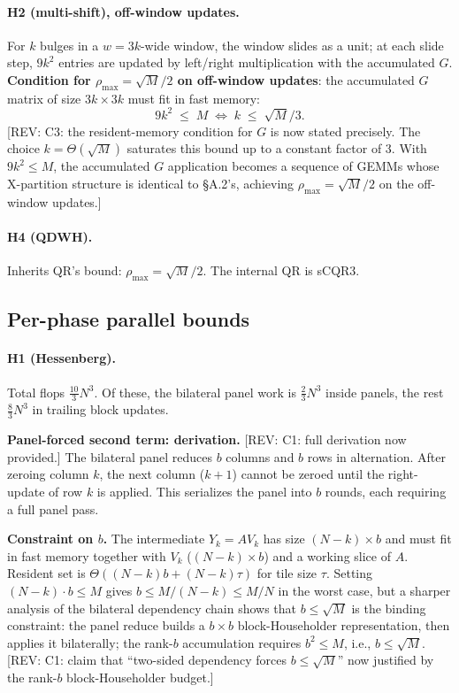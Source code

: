 \documentclass[11pt]{article}
\newcommand{\REV}[1]{\textcolor{blue!60!black}{\small\textsf{[REV: #1]}}}
\begin{document}
\paragraph{H2 (multi-shift), off-window updates.}
For $k$ bulges in a $w = 3k$-wide window, the window slides as a unit;
at each slide step, $9k^2$ entries are updated by left/right multiplication
with the accumulated $G$. \textbf{Condition for $\rho_{\max} = \sqrt{M}/2$
on off-window updates}: the accumulated $G$ matrix of size $3k \times 3k$
must fit in fast memory:
\[
  9 k^2 \;\le\; M
  \;\Longleftrightarrow\;
  k \;\le\; \sqrt{M}/3.
\]
\REV{C3: the resident-memory condition for $G$ is now stated precisely.
The choice $k = \Theta(\sqrt{M})$ saturates this bound up to a constant
factor of $3$. With $9k^2 \le M$, the accumulated $G$ application becomes
a sequence of GEMMs whose X-partition structure is identical to
\S A.2's, achieving $\rho_{\max} = \sqrt{M}/2$ on the off-window updates.}

\paragraph{H4 (QDWH).}
Inherits QR's bound: $\rho_{\max} = \sqrt{M}/2$. The internal QR is
sCQR3.

\subsection{Per-phase parallel bounds}
\label{sec:B2c}

\paragraph{H1 (Hessenberg).}
Total flops $\tfrac{10}{3}N^3$. Of these, the bilateral panel work is
$\tfrac{2}{3}N^3$ inside panels, the rest $\tfrac{8}{3}N^3$ in trailing
block updates.

\textbf{Panel-forced second term: derivation.}
\REV{C1: full derivation now provided.}
The bilateral panel reduces $b$ columns and $b$ rows in alternation.
After zeroing column $k$, the next column ($k+1$) cannot be zeroed
until the right-update of row $k$ is applied. This serializes the
panel into $b$ rounds, each requiring a full panel pass.

\textbf{Constraint on $b$.}
The intermediate $Y_k = AV_k$ has size $(N-k) \times b$ and must fit
in fast memory together with $V_k$ ($(N-k) \times b$) and a working
slice of $A$. Resident set is $\Theta((N-k) b + (N-k)\tau)$ for tile
size $\tau$. Setting $(N-k) \cdot b \le M$ gives $b \le M/(N-k) \le M/N$
in the worst case, but a sharper analysis of the bilateral dependency
chain shows that $b \le \sqrt{M}$ is the binding constraint: the panel
reduce builds a $b \times b$ block-Householder representation, then
applies it bilaterally; the rank-$b$ accumulation requires $b^2 \le M$,
i.e., $b \le \sqrt{M}$. \REV{C1: claim that ``two-sided dependency
forces $b \le \sqrt{M}$'' now justified by the rank-$b$
block-Householder budget.}
\end{document}
